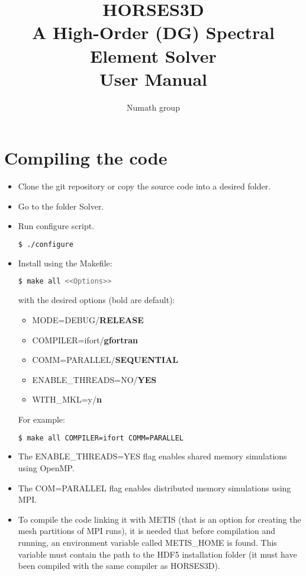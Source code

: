 \documentclass[a4paper,10pt]{report}
\title{\textbf{HORSES3D} \\ A \textbf{H}igh-\textbf{Or}der (DG) \textbf{S}pectral \textbf{E}lement \textbf{S}olver \\ \textbf{User Manual}}
\author{Numath group}
\begin{document}
\lstset{language=C++}

\maketitle

\tableofcontents

\chapter{Compiling the code} \label{sect:compiling}

\begin{itemize}
\item Clone the git repository or copy the source code into a desired folder.

\item Go to the folder Solver.

\item Run configure script.
\begin{lstlisting}[language=bash]
	$ ./configure
\end{lstlisting}
\item Install using the Makefile:
\begin{lstlisting}[language=bash]
	$ make all <<Options>>
\end{lstlisting}
with the desired options (bold are default):

\begin{itemize}
\item MODE=DEBUG/\textbf{RELEASE}
\item COMPILER=ifort/\textbf{gfortran}
\item COMM=PARALLEL/\textbf{SEQUENTIAL}
\item ENABLE\_THREADS=NO/\textbf{YES}
\item WITH\_MKL=y/\textbf{n}
\end{itemize}

For example:
\begin{lstlisting}[language=bash]
	$ make all COMPILER=ifort COMM=PARALLEL
\end{lstlisting}

\item The ENABLE\_THREADS=YES flag enables shared memory simulations using OpenMP.

\item The COM=PARALLEL flag enables distributed memory simulations using MPI.

\item To compile the code linking it with METIS (that is an option for creating the mesh partitions of MPI runs), it is needed that before compilation and running, an environment variable called METIS\_HOME is found. This variable must contain the path to the HDF5 installation folder (it must have been compiled with the same compiler as HORSES3D).


\end{itemize}
\end{document}
